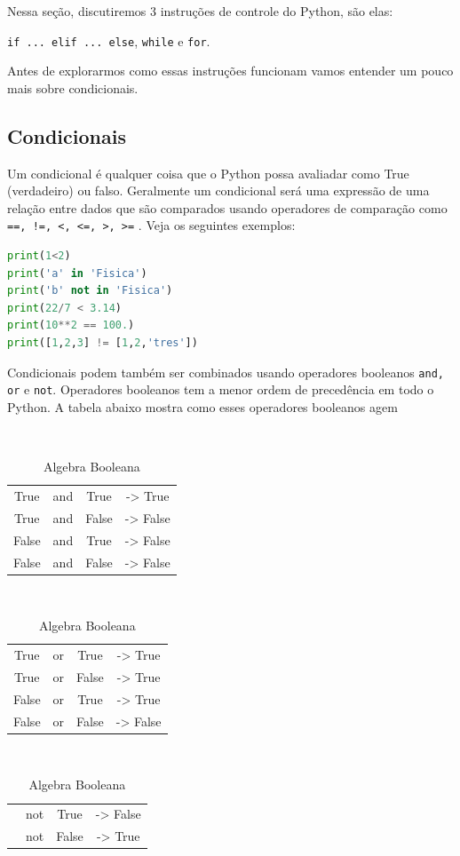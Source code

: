 Nessa seção, discutiremos 3 instruções de controle do Python, são elas:\\ 
\begin{center}
    {\tt if ... elif ... else}, {\tt while} e {\tt for}.
\end{center}
Antes de explorarmos como essas instruções funcionam vamos entender um pouco mais sobre condicionais.

\subsection{Condicionais}

Um condicional é qualquer coisa que o Python possa avaliadar como  True (verdadeiro) ou falso. Geralmente um condicional será uma expressão de uma relação entre dados que são comparados usando operadores de comparação como {\tt ==, !=, <, <=, >, >=} . Veja os seguintes exemplos:
\begin{lstlisting}[language=Python]
print(1<2)
print('a' in 'Fisica')
print('b' not in 'Fisica')
print(22/7 < 3.14)
print(10**2 == 100.)
print([1,2,3] != [1,2,'tres'])
\end{lstlisting}
Condicionais podem também ser combinados usando operadores booleanos {\tt and, or} e {\tt not}. Operadores booleanos tem a menor ordem de precedência em todo o Python. A tabela abaixo mostra como esses operadores booleanos agem
\begin{table}[h!]
\begin{minipage}{.36\textwidth}
    \centering
    {\tt 
    \begin{tabular}{c c c c}
     True & and & True & -> True\\
     True & and & False & -> False \\
     False & and & True & -> False \\
     False & and & False & -> False
    \end{tabular}}
    \end{minipage}
    \begin{minipage}{.36\textwidth}
    \centering
    {\tt 
    \begin{tabular}{c c c c}
     True & or & True & -> True\\
     True & or & False & -> True \\
     False & or & True & -> True \\
     False & or & False & -> False
    \end{tabular}}
    \end{minipage}
    \begin{minipage}{.3\textwidth}
    \centering
    {\tt 
    \begin{tabular}{c c c c}
      & not & True & -> False\\
      & not & False & -> True \\
     \end{tabular}}
    \end{minipage}
    \caption{Algebra Booleana}
    \label{tab:boolean}
\end{table}

